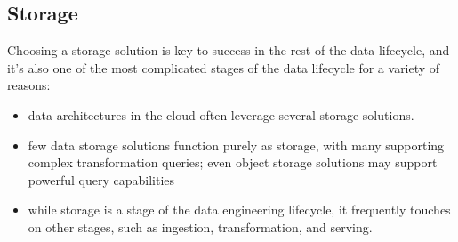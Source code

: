 \subsection{Storage}
Choosing a storage solution is key to success in the rest of the
data lifecycle, and it's also one of the most complicated stages
of the data lifecycle for a variety of reasons:
\begin{itemize}
    \item data architectures in the cloud often leverage several
    storage solutions.

    \item few data storage solutions function purely as storage,
    with many supporting complex transformation queries; even
    object storage solutions may support powerful query capabilities

    \item while storage is a stage of the data engineering
    lifecycle, it frequently touches on other stages,
    such as ingestion, transformation, and serving.
\end{itemize}




